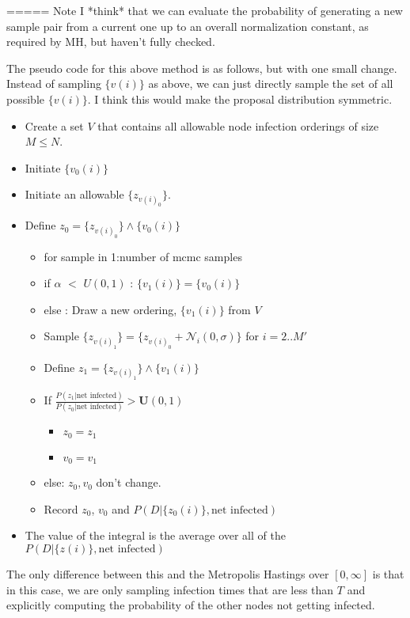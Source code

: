 \documentclass{article}
\begin{document}
        ===== Note I *think* that we can evaluate the probability of
        generating a new sample pair from a current one up to an overall
        normalization constant, as required by MH, but haven't fully checked.

        The pseudo code for this above method is as follows, but with one small
        change.  Instead of sampling $\{v(i)\}$ as above, we can just directly sample
        the set of all possible $\{v(i)\}$.  I think this would make the proposal 
        distribution symmetric.  

\begin{itemize}
\item Create a set $V$ that contains all allowable node infection orderings of 
size $M \le N$.
\item Initiate $\{v_0(i)\}$
\item Initiate an allowable $\{z_{v(i)_0}\}$.
\item Define $z_0 = \{z_{v(i)_0}\} \land \{v_0(i)\}$ 
\begin{itemize}
\item for sample in 1:number of mcmc samples
\item if $\alpha$ $<$ $U(0,1)$ : $\{v_1(i)\} = \{v_0(i)\}$
\item else : Draw a new ordering, $\{v_1(i)\}$ from $V$
\item Sample $\{z_{v(i)_1}\} = \{z_{v(i)_0} + \mathcal{N}_i(0, \sigma)\}$ for $i=2 ..M'$
\item Define $z_1 = \{z_{v(i)_1}\} \land \{v_1(i)\}$ 
\item If $\frac{P(z_1 | \text{net infected})}{P(z_0 | \text{net infected})} > \mathbf{U}(0,1)$
\begin{itemize}
\item $z_0 =z_1$
\item $v_0 = v_1$
\end{itemize}
\item else: $z_0, v_0$ don't change.
\item Record $z_0$, $v_0$ and $P(D | \{z_0(i)\}, \text{net infected} )$
\end{itemize}
\item The value of the integral is the average over all of the $P(D | \{z(i)\}, \text{net infected} )$
\end{itemize}

The only difference between this and the Metropolis Hastings over $[0, \infty]$ is that in this case, we are only sampling infection times that are less than $T$ and explicitly computing the probability of the other nodes not getting infected.  
\end{document}
